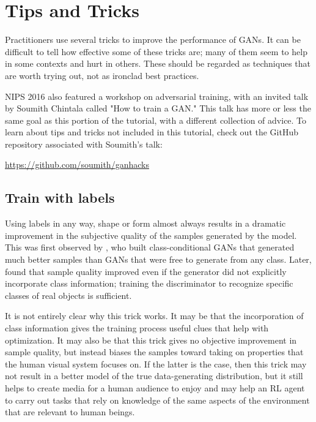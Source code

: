 \section{Tips and Tricks}

Practitioners use several tricks to improve the performance of GANs.
It can be difficult to tell how effective some of these tricks are;
many of them seem to help in some contexts and hurt in others.
These should be regarded as techniques that are worth trying out,
not as ironclad best practices.

NIPS 2016 also featured a workshop on adversarial training, with
an invited talk by Soumith Chintala called "How to train a GAN."
This talk has more or less the same goal as this portion of the tutorial,
with a different collection of advice.
To learn about tips and tricks not included in this tutorial, check
out the GitHub repository associated with Soumith's talk:

\url{https://github.com/soumith/ganhacks}


\subsection{Train with labels}

Using labels in any way, shape or form almost always results in a dramatic
improvement in the subjective quality of the samples generated by the model.
This was first observed by \citet{denton2015deep}, who built class-conditional
GANs that generated much better samples than GANs that were free to generate
from any class.
Later, \citet{Salimans-et-al-arxiv2014} found that sample quality improved
even if the generator did not explicitly incorporate class information; training
 the discriminator to recognize specific classes of real objects is sufficient.

 It is not entirely clear why this trick works.
 It may be that the incorporation of class information gives the training
 process useful clues that help with optimization.
 It may also be that this trick gives no objective improvement in sample quality,
 but instead biases the samples toward taking on properties that the human
 visual system focuses on.
 If the latter is the case, then this trick may not result in a better model
 of the true data-generating distribution, but it still helps to create media
 for a human audience to enjoy and may help an RL agent to carry out tasks
 that rely on knowledge of the same aspects of the environment that are relevant
 to human beings.

